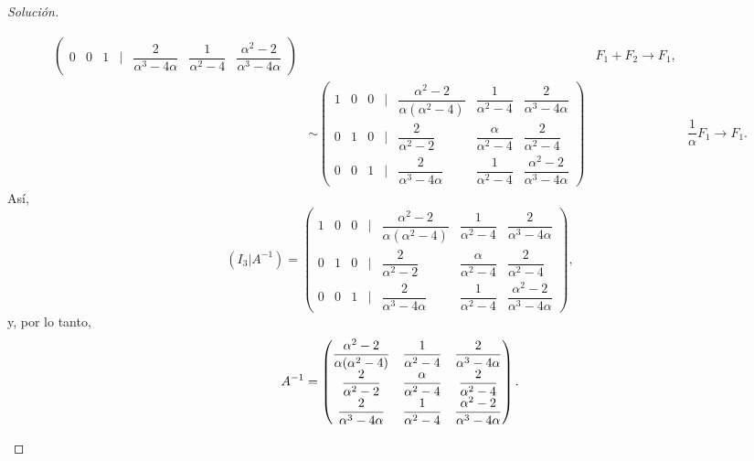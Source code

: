 \documentclass[a4,11pt]{aleph-notas}
\begin{document}
\begin{proof}[Solución]
\begin{enumerate}
\begin{align*}
\begin{pmatrix}
                0 & 0 & 1 & | & \dfrac{2}{\alpha^3-4\alpha} & \dfrac{1}{\alpha^2-4} & \dfrac{\alpha^2-2}{\alpha^3-4\alpha}
            \end{pmatrix} && F_1 + F_2 \rightarrow F_1, \\
            & \sim \begin{pmatrix}
                1 & 0 & 0 & | & \dfrac{\alpha^2-2}{\alpha(\alpha^2-4)} & \dfrac{1}{\alpha^2-4} & \dfrac{2}{\alpha^3-4\alpha}\\
                0 & 1 & 0 & | & \dfrac{2}{\alpha^2-2} & \dfrac{\alpha}{\alpha^2-4} & \dfrac{2}{\alpha^2-4}\\
                0 & 0 & 1 & | & \dfrac{2}{\alpha^3-4\alpha} & \dfrac{1}{\alpha^2-4} & \dfrac{\alpha^2-2}{\alpha^3-4\alpha}
            \end{pmatrix} && \dfrac{1}{\alpha} F_1 \rightarrow F_1.
    \end{align*}
    Así, 
    \[
        (I_3|A^{-1}) = \begin{pmatrix}
                1 & 0 & 0 & | & \dfrac{\alpha^2-2}{\alpha(\alpha^2-4)} & \dfrac{1}{\alpha^2-4} & \dfrac{2}{\alpha^3-4\alpha}\\
                0 & 1 & 0 & | & \dfrac{2}{\alpha^2-2} & \dfrac{\alpha}{\alpha^2-4} & \dfrac{2}{\alpha^2-4}\\
                0 & 0 & 1 & | & \dfrac{2}{\alpha^3-4\alpha} & \dfrac{1}{\alpha^2-4} & \dfrac{\alpha^2-2}{\alpha^3-4\alpha}
            \end{pmatrix},
    \]
    y, por lo tanto, 
    \[
        A^{-1} = \begin{pmatrix}
                \dfrac{\alpha^2-2}{\alpha(\alpha^2-4)} & \dfrac{1}{\alpha^2-4} & \dfrac{2}{\alpha^3-4\alpha}\\
                \dfrac{2}{\alpha^2-2} & \dfrac{\alpha}{\alpha^2-4} & \dfrac{2}{\alpha^2-4}\\
                \dfrac{2}{\alpha^3-4\alpha} & \dfrac{1}{\alpha^2-4} & \dfrac{\alpha^2-2}{\alpha^3-4\alpha}
            \end{pmatrix}. \qedhere
    \]
    \end{enumerate}
\end{proof}
\end{document}
